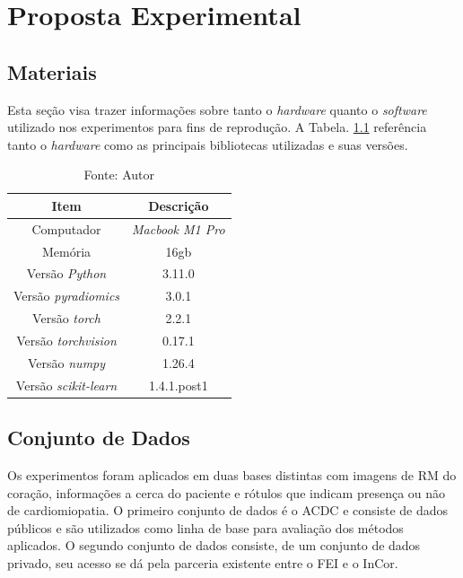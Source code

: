 \chapter{Proposta Experimental}
\label{chap:proposta}

\section{Materiais} 
\label{sec:cap5_materiais}

Esta seção visa trazer informações sobre tanto o \textit{hardware} quanto o \textit{software} utilizado nos experimentos para fins de reprodução. A Tabela. \ref{tab:hardware_software} referência tanto o \textit{hardware} como as principais bibliotecas utilizadas e suas versões.

\begin{table}[hbtp]
    \centering
    \renewcommand{\arraystretch}{1} %
    \begin{tabular}{|c|c|}
    \hline 
       \textbf{Item} & \textbf{Descrição}\\
    \hline 
       Computador & \textit{Macbook M1 Pro}  \\
    \hline 
       Memória & 16gb  \\
    \hline 
       Versão \textit{Python} & 3.11.0  \\
    \hline 
       Versão \textit{pyradiomics} & 3.0.1 \\
    \hline 
       Versão \textit{torch} & 2.2.1 \\
    \hline 
       Versão \textit{torchvision} & 0.17.1 \\
    \hline 
       Versão \textit{numpy} & 1.26.4 \\
    \hline 
       Versão \textit{scikit-learn} & 1.4.1.post1 \\
    \hline 
    \end{tabular} 
    \caption{Fonte: Autor}
    \label{tab:hardware_software}
\end{table}


\section{Conjunto de Dados} 
\label{sec:cap5_conj_dados}

Os experimentos foram  aplicados em duas bases distintas com imagens de RM do coração, informações a cerca do paciente e rótulos que indicam presença ou não de cardiomiopatia. O primeiro conjunto de dados é o \gls{ACDC} e consiste de dados públicos e são utilizados como linha de base para avaliação dos métodos aplicados. O segundo conjunto de dados consiste, de um conjunto de dados privado, seu acesso
se dá pela parceria existente entre o \gls{FEI} e o \gls{InCor}.

